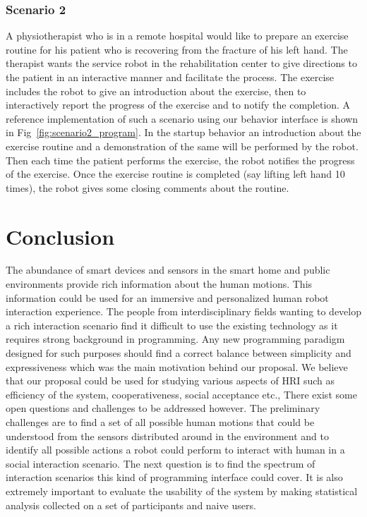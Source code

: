 \documentclass{llncs}
\begin{document}
\subsubsection{Scenario 2}%
A physiotherapist who is in a remote hospital would like to prepare an exercise routine for his patient who is recovering from the fracture of his left hand. The therapist wants the service robot in the rehabilitation center to give directions to the patient in an interactive manner and facilitate the process. The exercise includes the robot to give an introduction about the exercise, then to interactively report the progress of the exercise and to notify the completion. A reference implementation of such a scenario using our behavior interface is shown in Fig~\ref{fig:scenario2_program}. In the startup behavior an introduction about the exercise routine and a demonstration of the same will be performed by the robot. Then each time the patient performs the exercise, the robot notifies the progress of the exercise. Once the exercise routine is completed (say lifting left hand 10 times), the robot gives some closing comments about the routine.
\section{Conclusion}
The abundance of smart devices and sensors in the smart home and public environments provide rich information about the human motions. This information could be used for an immersive and personalized human robot interaction experience. The people from interdisciplinary fields wanting to develop a rich interaction scenario find it difficult to use the existing technology as it requires strong background in programming. Any new programming paradigm designed for such purposes should find a correct balance between simplicity and expressiveness which was the main motivation behind our proposal. We believe that our proposal could be used for studying various aspects of HRI such as efficiency of the system, cooperativeness, social acceptance etc., There exist some open questions and challenges to be addressed however. The preliminary challenges are to find a set of all possible human motions that could be understood from the sensors distributed around in the environment and to identify all possible actions a robot could perform to interact with human in a social interaction scenario. The next question is to find the spectrum of interaction scenarios this kind of programming interface could cover. It is also extremely important to evaluate the usability of the system by making statistical analysis collected on a set of participants and naive users.
\end{document}
